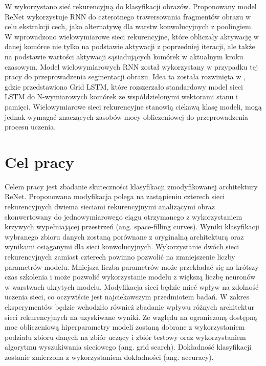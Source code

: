\documentclass[oneside, mag]{mgr}
\begin{document}
W \cite{DBLP:journals/corr/VisinKCMCB15} wykorzystano sieć rekurencyjną do klasyfikacji obrazów. Proponowany model ReNet wykorzystuje RNN do czterotnego trawersowania fragmentów obrazu w celu ekstrakcji cech, jako alternatywę dla warstw konwolucyjnych z poolingiem. W \cite{DBLP:journals/corr/abs-0705-2011} wprowadzono wielowymiarowe sieci rekurencyjne, które obliczały aktywację w danej komórce nie tylko na podstawie aktywacji z poprzedniej iteracji, ale także na podstawie wartości aktywacji sąsiadujących komórek w aktualnym kroku czasowym. Model wielowymiarowych RNN został wykorzystany w przypadku tej pracy do przeprowadzenia segmentacji obrazu. Idea ta została rozwinięta w \cite{DBLP:journals/corr/KalchbrennerDG15}, gdzie przedstawiono Grid LSTM, które rozszerzało standardowy model sieci LSTM do N-wymiarowych komórek ze współdzielonymi wektorami stanu i pamięci. Wielowymiarowe sieci rekurencyjne stanowią ciekawą klasę modeli, mogą jednak wymagać znaczących zasobów mocy obliczeniowej do przeprowadzenia procesu uczenia.

\section{Cel pracy}

Celem pracy jest zbadanie skuteczności klasyfikacji zmodyfikowanej architektury ReNet. Proponowana modyfikacja polega na zastąpieniu czterech sieci rekurencyjnych dwiema sieciami rekurencyjnymi analizącymi obraz skonwertowany do jednowymiarowego ciągu otrzymanego z wykorzystaniem krzywych wypełniającej przestrzeń (ang. space-filling curves). Wyniki klasyfikacji wybranego zbioru danych zostaną porównane z oryginalną architekturą oraz wynikami osiąganymi dla sieci konwolucyjnych. Wykorzystanie dwóch sieci rekurencyjnych zamiast czterech powinno pozwolić na zmniejszenie liczby parametrów modelu. Mniejsza liczba parametrów może przekładać się na krótszy czas szkolenia i może pozwolić wykorzystanie modelu z większą liczbę neuronów w warstwach ukrytych modelu. Modyfikacja sieci będzie mieć wpływ na zdolność uczenia sieci, co oczywiście jest najciekawszym przedmiotem badań. W zakres eksperymentów będzie wchodziło również zbadanie wpływu różnych architektur sieci rekurencyjnych na uzyskiwane wyniki. Ze względu na ograniczoną dostępną moc obliczeniową hiperparametry modeli zostaną dobrane z wykorzystaniem podziału zbioru danych na zbiór uczący i zbiór testowy oraz wykorzystaniem algorytmu wyszukiwania sieciowego (ang. grid search). Dokładność klasyfikacji zostanie zmierzona z wykorzystaniem dokładności (ang. accuracy).
\end{document}
